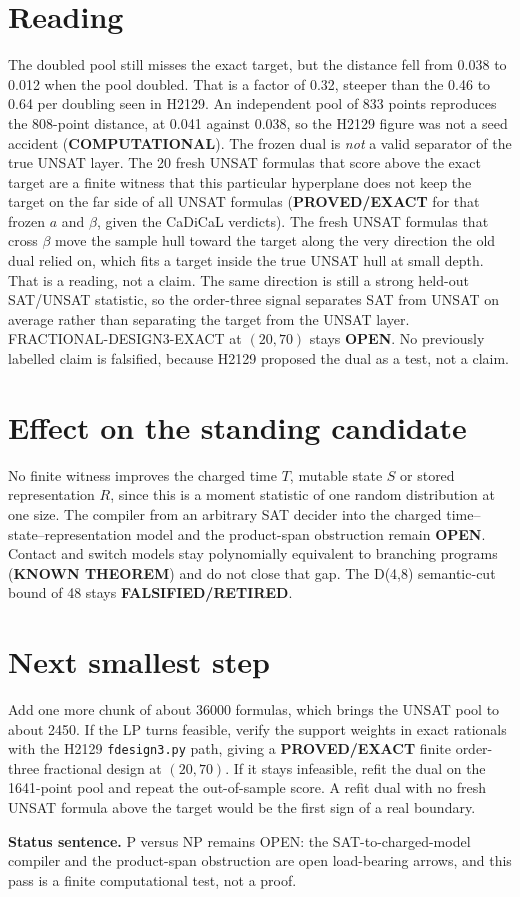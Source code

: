 \documentclass[11pt]{article}
\begin{document}
\section*{Reading}
The doubled pool still misses the exact target, but the distance fell from 0.038 to 0.012 when the pool doubled. That is a factor of 0.32, steeper than the 0.46 to 0.64 per doubling seen in H2129. An independent pool of 833 points reproduces the 808-point distance, at 0.041 against 0.038, so the H2129 figure was not a seed accident (\textbf{COMPUTATIONAL}). The frozen dual is \emph{not} a valid separator of the true UNSAT layer. The 20 fresh UNSAT formulas that score above the exact target are a finite witness that this particular hyperplane does not keep the target on the far side of all UNSAT formulas (\textbf{PROVED/EXACT} for that frozen $a$ and $\beta$, given the CaDiCaL verdicts). The fresh UNSAT formulas that cross $\beta$ move the sample hull toward the target along the very direction the old dual relied on, which fits a target inside the true UNSAT hull at small depth. That is a reading, not a claim. The same direction is still a strong held-out SAT/UNSAT statistic, so the order-three signal separates SAT from UNSAT on average rather than separating the target from the UNSAT layer. FRACTIONAL-DESIGN3-EXACT at $(20,70)$ stays \textbf{OPEN}. No previously labelled claim is falsified, because H2129 proposed the dual as a test, not a claim.

\section*{Effect on the standing candidate}
No finite witness improves the charged time $T$, mutable state $S$ or stored representation $R$, since this is a moment statistic of one random distribution at one size. The compiler from an arbitrary SAT decider into the charged time--state--representation model and the product-span obstruction remain \textbf{OPEN}. Contact and switch models stay polynomially equivalent to branching programs (\textbf{KNOWN THEOREM}) and do not close that gap. The D(4,8) semantic-cut bound of 48 stays \textbf{FALSIFIED/RETIRED}.

\section*{Next smallest step}
Add one more chunk of about 36000 formulas, which brings the UNSAT pool to about 2450. If the LP turns feasible, verify the support weights in exact rationals with the H2129 \texttt{fdesign3.py} path, giving a \textbf{PROVED/EXACT} finite order-three fractional design at $(20,70)$. If it stays infeasible, refit the dual on the 1641-point pool and repeat the out-of-sample score. A refit dual with no fresh UNSAT formula above the target would be the first sign of a real boundary.

\bigskip
\noindent\textbf{Status sentence.} P versus NP remains OPEN: the SAT-to-charged-model compiler and the product-span obstruction are open load-bearing arrows, and this pass is a finite computational test, not a proof.
\end{document}
